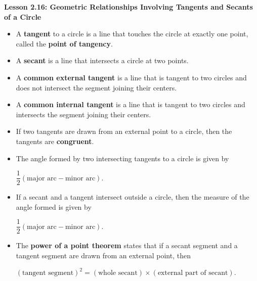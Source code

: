 \begin{center}
\textbf{Lesson 2.16: Geometric Relationships Involving Tangents and Secants of a Circle}
\end{center}

\vspace*{-1.5ex}

\begin{itemize}
    \item A \textbf{tangent} to a circle is a line that touches the circle at exactly one point, called the \textbf{point of tangency}.
    \item A \textbf{secant} is a line that intersects a circle at two points.
    \item A \textbf{common external tangent} is a line that is tangent to two circles and does not intersect the segment joining their centers.
    \item A \textbf{common internal tangent} is a line that is tangent to two circles and intersects the segment joining their centers.
    \item If two tangents are drawn from an external point to a circle, then the tangents are \textbf{congruent}.
    \item The angle formed by two intersecting tangents to a circle is given by
      
    {\centering $ 
    \dfrac{1}{2} ( \text{major arc} - \text{minor arc}).
    $\par} 
\item If a secant and a tangent intersect outside a circle, then the measure of the angle formed is given by
  
    {\centering $
    \dfrac{1}{2} ( \text{major arc} - \text{minor arc}).
    $\par}
\item The \textbf{power of a point theorem} states that if a secant segment and a tangent segment are drawn from an external point, then
  
    {\centering $
    ( \text{tangent segment} )^2 = ( \text{whole secant} ) \times ( \text{external part of secant}).
    $\par}
\end{itemize}
